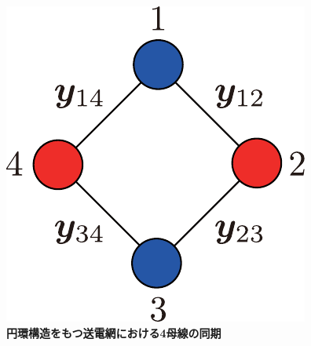 \documentclass[tombow,dvipdfmx]{corona-a5-1.1}
\begin{document}
%

\begin{figure}[t]
\centering
\includegraphics[width = .20\linewidth]{figs/4busbox}
\medskip
\caption{\textbf{円環構造をもつ送電網における4母線の同期}}
\label{fig:4busbox}
\medskip
\end{figure}
\end{document}
